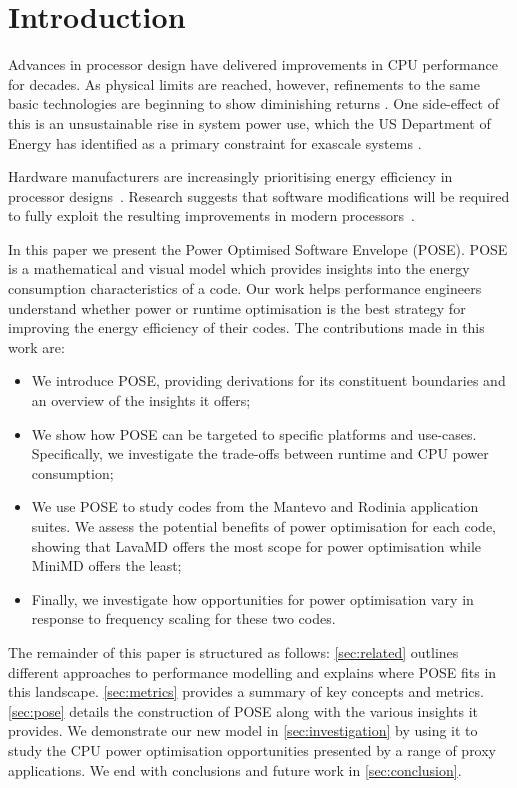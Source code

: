 \section{Introduction} \noindent
Advances in processor design have delivered improvements in CPU performance for decades. As physical limits are reached, however, refinements to the same basic technologies are beginning to show diminishing returns \cite{esmaeilzadeh:2011aa}. One side-effect of this is an unsustainable rise in system power use, which the US Department of Energy has identified as a primary constraint for exascale systems \cite{shalf:2011aa}.

Hardware manufacturers are increasingly prioritising energy efficiency in processor designs~\cite{kurd:2014aa}. 
Research suggests that software modifications will be required to fully exploit the resulting improvements in modern processors~\cite{shao:2013aa}.

In this paper we present the Power Optimised Software Envelope (POSE).
POSE is a mathematical and visual model which provides insights into the energy consumption characteristics of a code.
Our work helps performance engineers understand whether power or runtime optimisation is the best strategy for improving the energy efficiency of their codes.
The contributions made in this work are:
\begin{itemize}
  \item We introduce POSE, providing derivations for its constituent boundaries and an overview of the insights it offers;
  \item We show how POSE can be targeted to specific platforms and use-cases. 
        Specifically, we investigate the trade-offs between runtime and CPU power consumption;
  \item We use POSE to study codes from the Mantevo and Rodinia application suites.
        We assess the potential benefits of power optimisation for each code, showing that LavaMD offers the most scope for power optimisation while MiniMD offers the least;
  \item Finally, we investigate how opportunities for power optimisation vary in response to frequency scaling for these two codes.
\end{itemize}

The remainder of this paper is structured as follows: \autoref{sec:related} outlines different approaches to performance modelling and explains where POSE fits in this landscape.
\autoref{sec:metrics} provides a summary of key concepts and metrics.
\autoref{sec:pose} details the construction of POSE along with the various insights it provides.
We demonstrate our new model in \autoref{sec:investigation} by using it to study the CPU power optimisation opportunities presented by a range of proxy applications. 
We end with conclusions and future work in \autoref{sec:conclusion}.
